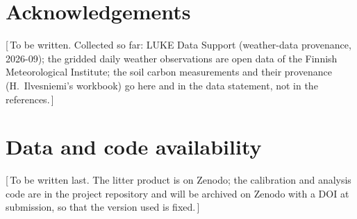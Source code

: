 \documentclass[11pt]{article}
\newcommand{\gap}[1]{\textcolor{red!70!black}{\small[\,#1\,]}}
\begin{document}
\section*{Acknowledgements}
\gap{To be written. Collected so far: LUKE Data Support (weather-data provenance,
2026-09); the gridded daily weather observations are open data of the Finnish
Meteorological Institute; the soil carbon measurements and their provenance
(H.~Ilvesniemi's workbook) go here and in the data statement, not in the references.}

\section*{Data and code availability}
\gap{To be written last. The litter product is on Zenodo; the calibration and
analysis code are in the project repository and will be archived on Zenodo with a DOI
at submission, so that the version used is fixed.}



\end{document}
